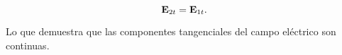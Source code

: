 \begin{equation}
	\label{eq:CampoETangencial}
	\textbf{E}_{2t} = \textbf{E}_{1t}.
\end{equation}

Lo que demuestra que las componentes tangenciales del campo eléctrico son continuas.



